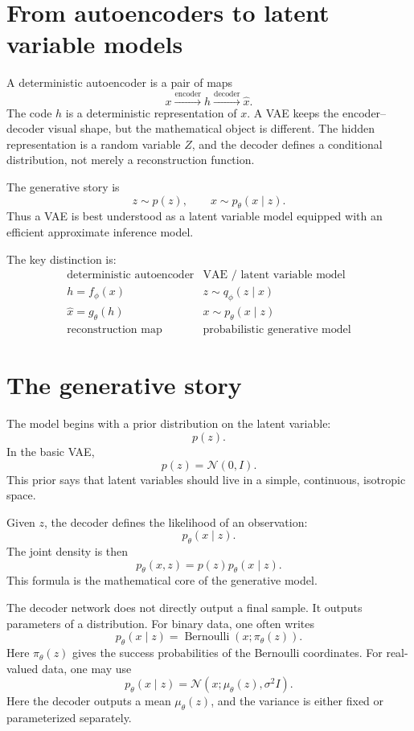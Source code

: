
\section{From autoencoders to latent variable models}

A deterministic autoencoder is a pair of maps
\[
  x\xrightarrow{\mathrm{encoder}}h\xrightarrow{\mathrm{decoder}}\widehat x.
\]
The code \(h\) is a deterministic representation of \(x\).  A VAE keeps the encoder--decoder visual shape, but the mathematical object is different.  The hidden representation is a random variable \(Z\), and the decoder defines a conditional distribution, not merely a reconstruction function.

The generative story is
\[
  z\sim p(z),\qquad x\sim p_\theta(x\mid z).
\]
Thus a VAE is best understood as a latent variable model equipped with an efficient approximate inference model.

The key distinction is:
\[
\begin{array}{c|c}
\text{deterministic autoencoder} & \text{VAE / latent variable model}\\
\hline
h=f_\phi(x) & z\sim q_\phi(z\mid x)\\
\widehat x=g_\theta(h) & x\sim p_\theta(x\mid z)\\
\text{reconstruction map} & \text{probabilistic generative model}
\end{array}
\]

\section{The generative story}

The model begins with a prior distribution on the latent variable:
\[
  p(z).
\]
In the basic VAE,
\[
  p(z)=\mathcal N(0,I).
\]
This prior says that latent variables should live in a simple, continuous, isotropic space.

Given \(z\), the decoder defines the likelihood of an observation:
\[
  p_\theta(x\mid z).
\]
The joint density is then
\[
  p_\theta(x,z)=p(z)p_\theta(x\mid z).
\]
This formula is the mathematical core of the generative model.

The decoder network does not directly output a final sample.  It outputs parameters of a distribution.  For binary data, one often writes
\[
  p_\theta(x\mid z)=\operatorname{Bernoulli}(x;\pi_\theta(z)).
\]
Here \(\pi_\theta(z)\) gives the success probabilities of the Bernoulli coordinates.  For real-valued data, one may use
\[
  p_\theta(x\mid z)=\mathcal N(x;\mu_\theta(z),\sigma^2 I).
\]
Here the decoder outputs a mean \(\mu_\theta(z)\), and the variance is either fixed or parameterized separately.

